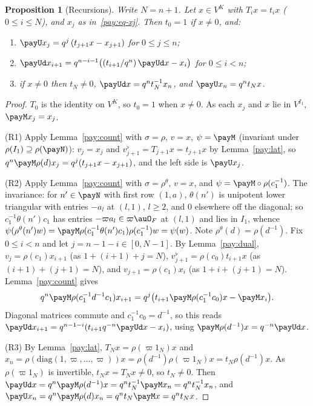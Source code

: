 \documentclass[10pt]{amsart}
\newtheorem{proposition}[theorem]{Proposition}
\theoremstyle{definition}
\theoremstyle{remark}
\begin{document}
\begin{proposition}[Recursions]\label{pay:rec}
Write $N=n+1$. Let $x\in V^K$ with $T_ix=t_ix$ ($0\le i\le N$), and $x_j$ as in~\eqref{pay:eq-xj}.
Then $t_0=1$ if $x\ne0$, and:
\begin{enumerate}
\item[(R1)] $\payU x_j=q^j\,(t_{j+1}x-x_{j+1})$ for $0\le j\le n$;
\item[(R2)] $\payUd x_{i+1}=q^{n-i-1}\bigl((t_{i+1}/q^n)\,\payUd x-x_i\bigr)$ for $0\le i<n$;
\item[(R3)] if $x\ne0$ then $t_N\ne0$, $\payUd x=q^nt_N^{-1}x_n$, and $\payU x_n=q^nt_Nx$.
\end{enumerate}
\end{proposition}
\begin{proof}
$T_0$ is the identity on $V^K$, so $t_0=1$ when $x\ne0$. As each $x_j$ and $x$ lie in $V^{I_1}$,
$\payM x_j=x_j$.

(R1) Apply Lemma~\ref{pay:count} with $\sigma=\rho$, $v=x$, $\psi=\payM$ (invariant under $\rho(I_1)
\supseteq\rho(\payN)$): $v_j=x_j$ and $v^\flat_{j+1}=T_{j+1}x=t_{j+1}x$ by Lemma~\ref{pay:lat}, so
$q^n\payM\rho(d)x_j=q^j(t_{j+1}x-x_{j+1})$, and the left side is $\payU x_j$.

(R2) Apply Lemma~\ref{pay:count} with $\sigma=\rho^\theta$, $v=x$, and $\psi=\payM\circ\rho(c_1^{-1})$.
The invariance: for $n'\in\payN$ with first row $(1,a)$, $\theta(n')$ is unipotent lower triangular with
entries $-a_l$ at $(l,1)$, $l\ge2$, and $0$ elsewhere off the diagonal; so $c_1^{-1}\theta(n')c_1$ has
entries $-\varpi a_l\in\varpi\auO_F$ at $(l,1)$ and lies in $I_1$, whence $\psi(\rho^\theta(n')w)=
\payM\rho(c_1^{-1}\theta(n')c_1)\rho(c_1^{-1})w=\psi(w)$. Note $\rho^\theta(d)=\rho(d^{-1})$. Fix
$0\le i<n$ and let $j=n-1-i\in[0,N-1]$. By Lemma~\ref{pay:dual}, $v_j=\rho(c_1)x_{i+1}$ (as $1+(i+1)+j=N$), $v^\flat_{j+1}=\rho(c_0)t_{i+1}x$ (as
$(i+1)+(j+1)=N$), and $v_{j+1}=\rho(c_1)x_i$ (as $1+i+(j+1)=N$). Lemma~\ref{pay:count} gives
\[
q^n\payM\rho(c_1^{-1}d^{-1}c_1)x_{i+1}=q^j\bigl(t_{i+1}\payM\rho(c_1^{-1}c_0)x-\payM x_i\bigr).
\]
Diagonal matrices commute and $c_1^{-1}c_0=d^{-1}$, so this reads $\payUd x_{i+1}=q^{n-1-i}(t_{i+1}
q^{-n}\payUd x-x_i)$, using $\payM\rho(d^{-1})x=q^{-n}\payUd x$.

(R3) By Lemma~\ref{pay:lat}, $T_Nx=\rho(\varpi1_N)x$ and $x_n=\rho(\mathrm{diag}(1,\varpi,\dots,
\varpi))x=\rho(d^{-1})\rho(\varpi1_N)x=t_N\rho(d^{-1})x$. As $\rho(\varpi1_N)$ is invertible,
$t_Nx=T_Nx\ne0$, so $t_N\ne0$. Then $\payUd x=q^n\payM\rho(d^{-1})x=q^nt_N^{-1}\payM x_n=q^nt_N^{-1}x_n$,
and $\payU x_n=q^n\payM\rho(d)x_n=q^nt_N\payM x=q^nt_Nx$.
\end{proof}
\end{document}
